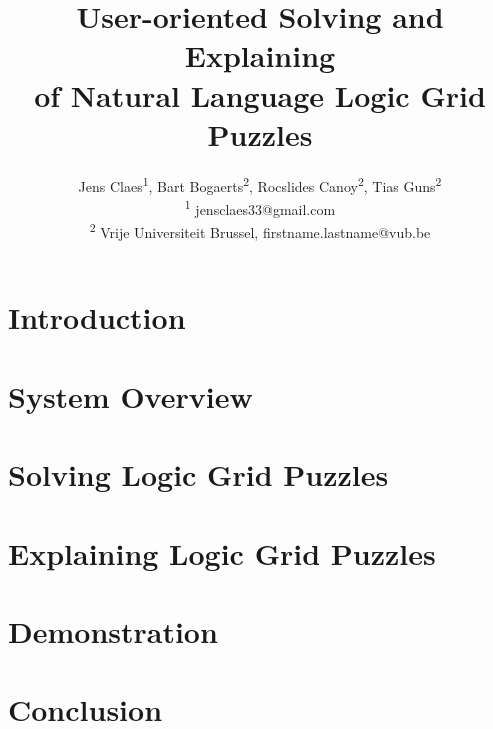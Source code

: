 \documentclass[letterpaper]{article} %
\title{User-oriented Solving and Explaining \\of Natural Language Logic Grid Puzzles}
\author{Jens Claes\textsuperscript{\rm 1}, Bart Bogaerts\textsuperscript{\rm 2}, Rocslides Canoy\textsuperscript{\rm 2}, Tias Guns\textsuperscript{\rm 2} \\
\textsuperscript{\rm 1} jensclaes33@gmail.com\\
\textsuperscript{\rm 2} Vrije Universiteit Brussel, firstname.lastname@vub.be %
}
\begin{document}
 
 \newcommand\ourtool{\logicname{HolyZebra}}

\maketitle

\begin{abstract}

\end{abstract}

\section{Introduction}




\section{System Overview}


%

\section{Solving Logic Grid Puzzles}\label{sec:solving}


\section{Explaining Logic Grid Puzzles}\label{sec:expl}


\section{Demonstration}\label{sec:demo}


\section{Conclusion}




\end{document}
